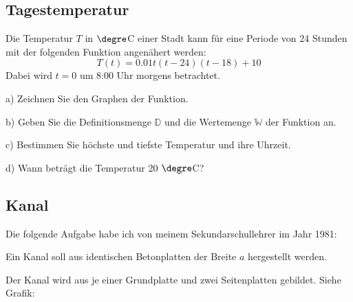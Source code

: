 \subsection{Tagestemperatur}

Die Temperatur $T$ in $\degre$C einer Stadt kann für eine Periode von 24 Stunden mit der folgenden Funktion
angenähert werden:
 $$T(t) = 0.01t(t-24)(t-18)+10$$
 Dabei wird $t=0$ um 8:00 Uhr morgens betrachtet.

a)
Zeichnen Sie den Graphen der Funktion.

b) 
Geben Sie die Definitionsmenge $\mathbb{D}$ und die Wertemenge
$\mathbb{W}$ der Funktion an.

c)
Bestimmen Sie höchste und tiefste Temperatur und ihre Uhrzeit.

d)
Wann beträgt die Temperatur 20 $\degre$C?


\subsection{Kanal}

Die folgende Aufgabe habe ich von meinem Sekundarschullehrer im Jahr
1981:

Ein Kanal soll aus identischen Betonplatten der Breite $a$ hergestellt werden.

Der Kanal wird aus je einer Grundplatte und zwei Seitenplatten
gebildet. Siehe Grafik:


